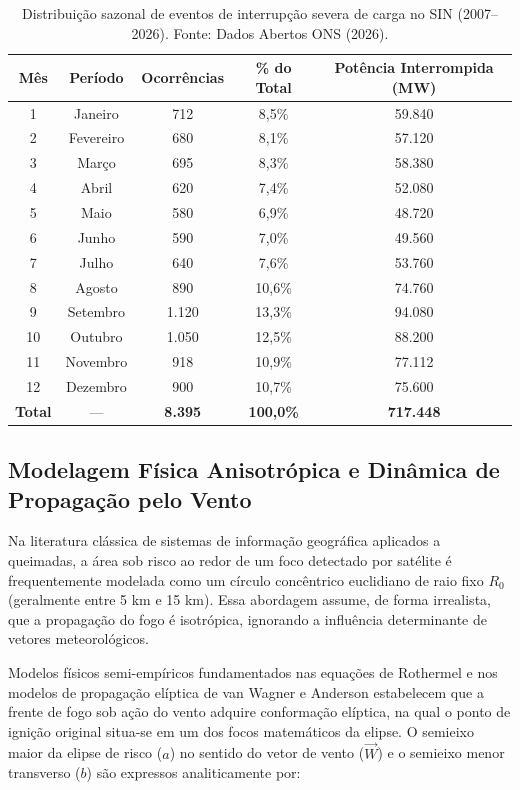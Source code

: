 \begin{table}[htbp]
\centering
\small
\caption{Distribuição sazonal de eventos de interrupção severa de carga no SIN (2007--2026). Fonte: Dados Abertos ONS (2026).}
\label{tab:sazonalidade_ons}
\begin{tabular}{ccccc}
\hline
\textbf{Mês} & \textbf{Período} & \textbf{Ocorrências} & \textbf{\% do Total} & \textbf{Potência Interrompida (MW)} \\
\hline
1 & Janeiro & 712 & 8,5\% & 59.840 \\
2 & Fevereiro & 680 & 8,1\% & 57.120 \\
3 & Março & 695 & 8,3\% & 58.380 \\
4 & Abril & 620 & 7,4\% & 52.080 \\
5 & Maio & 580 & 6,9\% & 48.720 \\
6 & Junho & 590 & 7,0\% & 49.560 \\
7 & Julho & 640 & 7,6\% & 53.760 \\
8 & Agosto & 890 & 10,6\% & 74.760 \\
9 & Setembro & 1.120 & 13,3\% & 94.080 \\
10 & Outubro & 1.050 & 12,5\% & 88.200 \\
11 & Novembro & 918 & 10,9\% & 77.112 \\
12 & Dezembro & 900 & 10,7\% & 75.600 \\
\hline
\textbf{Total} & --- & \textbf{8.395} & \textbf{100,0\%} & \textbf{717.448} \\
\hline
\end{tabular}
\end{table}

\subsection{Modelagem Física Anisotrópica e Dinâmica de Propagação pelo Vento}
\label{sbc:modelagem_vento}

Na literatura clássica de sistemas de informação geográfica aplicados a queimadas, a área sob risco ao redor de um foco detectado por satélite é frequentemente modelada como um círculo concêntrico euclidiano de raio fixo $R_0$ (geralmente entre 5 km e 15 km). Essa abordagem assume, de forma irrealista, que a propagação do fogo é isotrópica, ignorando a influência determinante de vetores meteorológicos.

Modelos físicos semi-empíricos fundamentados nas equações de Rothermel \cite{rothermel1972mathematical} e nos modelos de propagação elíptica de van Wagner \cite{vanwagner1969combined} e Anderson estabelecem que a frente de fogo sob ação do vento adquire conformação elíptica, na qual o ponto de ignição original situa-se em um dos focos matemáticos da elipse. O semieixo maior da elipse de risco ($a$) no sentido do vetor de vento ($\vec{W}$) e o semieixo menor transverso ($b$) são expressos analiticamente por:

